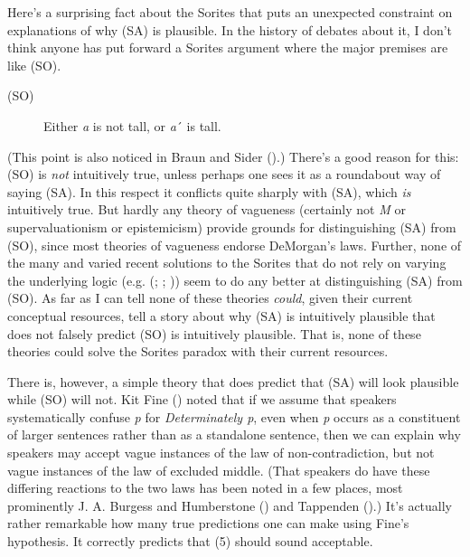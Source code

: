 \documentclass[
  10pt,
  letterpaper,
  DIV=11,
  numbers=noendperiod,
  twoside]{scrartcl}
\begin{document}
Here's a surprising fact about the Sorites that puts an unexpected
constraint on explanations of why (SA) is plausible. In the history of
debates about it, I don't think anyone has put forward a Sorites
argument where the major premises are like (SO).

\begin{description}
\item[(SO)]
Either \emph{a} is not tall, or \emph{a}´ is tall.
\end{description}

(This point is also noticed in Braun and Sider
().) There's a good reason for this: (SO)
is \emph{not} intuitively true, unless perhaps one sees it as a
roundabout way of saying (SA). In this respect it conflicts quite
sharply with (SA), which \emph{is} intuitively true. But hardly any
theory of vagueness (certainly not \emph{M} or supervaluationism or
epistemicism) provide grounds for distinguishing (SA) from (SO), since
most theories of vagueness endorse DeMorgan's laws. Further, none of the
many and varied recent solutions to the Sorites that do not rely on
varying the underlying logic (e.g. (;
;
)) seem to do any better at
distinguishing (SA) from (SO). As far as I can tell none of these
theories \emph{could}, given their current conceptual resources, tell a
story about why (SA) is intuitively plausible that does not falsely
predict (SO) is intuitively plausible. That is, none of these theories
could solve the Sorites paradox with their current resources.

There is, however, a simple theory that does predict that (SA) will look
plausible while (SO) will not. Kit Fine ()
noted that if we assume that speakers systematically confuse \emph{p}
for \emph{Determinately p}, even when \emph{p} occurs as a constituent
of larger sentences rather than as a standalone sentence, then we can
explain why speakers may accept vague instances of the law of
non-contradiction, but not vague instances of the law of excluded
middle. (That speakers do have these differing reactions to the two laws
has been noted in a few places, most prominently J. A. Burgess and
Humberstone () and Tappenden
().) It's actually rather remarkable
how many true predictions one can make using Fine's hypothesis. It
correctly predicts that (5) should sound acceptable.
\end{document}
